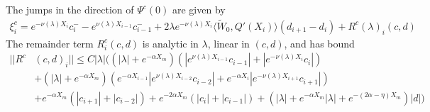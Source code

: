 \documentclass[thesis.tex]{subfiles}
\begin{document}
\begin{lemma}\label{jumpcenteradj}
The jumps in the direction of $\Psi^c(0)$ are given by
\begin{equation}\label{xic}
\begin{aligned}
\xi^c_i = e^{-\nu(\lambda) X_i} c_i^- - e^{\nu(\lambda) X_{i-1}} c_{i-1}^- + 2 \lambda e^{-\nu(\lambda)X_i} \langle \tilde{W}_0, Q'(X_i) \rangle (d_{i+1} - d_i )  + R^c(\lambda)_i(c, d)
\end{aligned}
\end{equation}
The remainder term $R^c_i(c, d)$ is analytic in $\lambda$, linear in $(c, d)$, and has bound
\begin{align*}
||R^c&(c, d)_i|| \leq C |\lambda| \Big(
(|\lambda| + e^{-\alpha X_m})(|e^{\nu(\lambda)X_{i-1}}c_{i-1}| + |e^{-\nu(\lambda)X_i}c_i|) \\
&+ (|\lambda| + e^{-\alpha X_m})( e^{-\alpha X_{i-1}} |e^{\nu(\lambda)X_{i-2}}c_{i-2}| + e^{-\alpha X_i} |e^{-\nu(\lambda)X_{i+1}}c_{i+1}|)  \\
&+ e^{-\alpha X_m}(|c_{i+1}|+|c_{i-2}|) + e^{-2 \alpha X_m}(|c_i|+|c_{i-1}|) + (|\lambda| + e^{-\alpha X_m}|\lambda| + e^{-(2 \alpha - \eta) X_m })|d|
\Big)
\end{align*}


\end{lemma}
\end{document}
